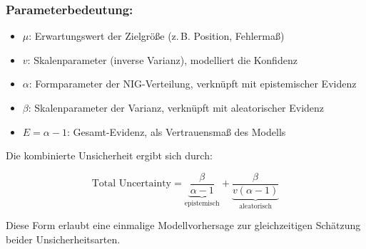 \subsubsection*{Parameterbedeutung:}
\begin{itemize}
  \item $\mu$: Erwartungswert der Zielgröße (z.\,B. Position, Fehlermaß)
  \item $v$: Skalenparameter (inverse Varianz), modelliert die Konfidenz
  \item $\alpha$: Formparameter der NIG-Verteilung, verknüpft mit epistemischer Evidenz
  \item $\beta$: Skalenparameter der Varianz, verknüpft mit aleatorischer Evidenz
  \item $E = \alpha - 1$: Gesamt-Evidenz, als Vertrauensmaß des Modells
\end{itemize}

Die kombinierte Unsicherheit ergibt sich durch:

\[
\text{Total Uncertainty} = \underbrace{\frac{\beta}{\alpha - 1}}_{\text{epistemisch}} + \underbrace{\frac{\beta}{v(\alpha - 1)}}_{\text{aleatorisch}}
\]

Diese Form erlaubt eine einmalige Modellvorhersage zur gleichzeitigen Schätzung beider Unsicherheitsarten.







